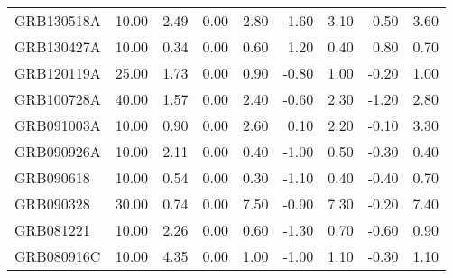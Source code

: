 \begin{tabular}{lrrrrrrrr}
GRB130518A & 10.00 & 2.49 & 0.00 & 2.80 & -1.60 & 3.10 & -0.50 & 3.60 \\
GRB130427A & 10.00 & 0.34 & 0.00 & 0.60 & 1.20 & 0.40 & 0.80 & 0.70 \\
GRB120119A & 25.00 & 1.73 & 0.00 & 0.90 & -0.80 & 1.00 & -0.20 & 1.00 \\
GRB100728A & 40.00 & 1.57 & 0.00 & 2.40 & -0.60 & 2.30 & -1.20 & 2.80 \\
GRB091003A & 10.00 & 0.90 & 0.00 & 2.60 & 0.10 & 2.20 & -0.10 & 3.30 \\
GRB090926A & 10.00 & 2.11 & 0.00 & 0.40 & -1.00 & 0.50 & -0.30 & 0.40 \\
GRB090618 & 10.00 & 0.54 & 0.00 & 0.30 & -1.10 & 0.40 & -0.40 & 0.70 \\
GRB090328 & 30.00 & 0.74 & 0.00 & 7.50 & -0.90 & 7.30 & -0.20 & 7.40 \\
GRB081221 & 10.00 & 2.26 & 0.00 & 0.60 & -1.30 & 0.70 & -0.60 & 0.90 \\
GRB080916C & 10.00 & 4.35 & 0.00 & 1.00 & -1.00 & 1.10 & -0.30 & 1.10 \\
\bottomrule
\end{tabular}
